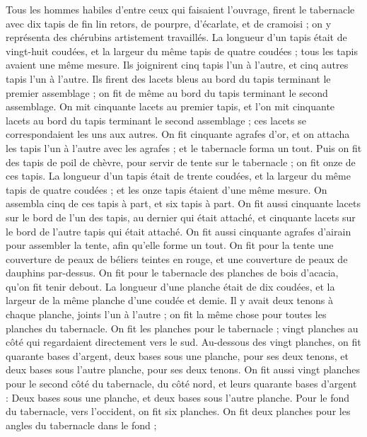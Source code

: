 \begin{multicols}{2}
Tous les hommes habiles d'entre ceux qui faisaient l'ouvrage, firent le tabernacle avec dix tapis de fin lin retors, de pourpre, d'écarlate, et de cramoisi ; on y représenta des chérubins artistement travaillés.
La longueur d'un tapis était de vingt-huit coudées, et la largeur du même tapis de quatre coudées ; tous les tapis avaient une même mesure.
Ils joignirent cinq tapis l'un à l'autre, et cinq autres tapis l'un à l'autre.
Ils firent des lacets bleus au bord du tapis terminant le premier assemblage ; on fit de même au bord du tapis terminant le second assemblage.
On mit cinquante lacets au premier tapis, et l’on mit cinquante lacets au bord du tapis terminant le second assemblage ; ces lacets se correspondaient les uns aux autres.
On fit cinquante agrafes d'or, et on attacha les tapis l'un à l'autre avec les agrafes ; et le tabernacle forma un tout.
Puis on fit des tapis de poil de chèvre, pour servir de tente sur le tabernacle ; on fit onze de ces tapis.
La longueur d'un tapis était de trente coudées, et la largeur du même tapis de quatre coudées ; et les onze tapis étaient d'une même mesure.
On assembla cinq de ces tapis à part, et six tapis à part.
On fit aussi cinquante lacets sur le bord de l'un des tapis, au dernier qui était attaché, et cinquante lacets sur le bord de l'autre tapis qui était attaché.
On fit aussi cinquante agrafes d'airain pour assembler la tente, afin qu’elle forme un tout.
On fit pour la tente une couverture de peaux de béliers teintes en rouge, et une couverture de peaux de dauphins par-dessus.
On fit pour le tabernacle des planches de bois d’acacia, qu'on fit tenir debout.
La longueur d’une planche était de dix coudées, et la largeur de la même planche d'une coudée et demie.
Il y avait deux tenons à chaque planche, joints l'un à l'autre ; on fit la même chose pour toutes les planches du tabernacle.
On fit les planches pour le tabernacle ; vingt planches au côté qui regardaient directement vers le sud.
Au-dessous des vingt planches, on fit quarante bases d'argent, deux bases sous une planche, pour ses deux tenons, et deux bases sous l'autre planche, pour ses deux tenons.
On fit aussi vingt planches pour le second côté du tabernacle, du côté nord,
et leurs quarante bases d'argent : Deux bases sous une planche, et deux bases sous l'autre planche.
Pour le fond du tabernacle, vers l'occident, on fit six planches.
On fit deux planches pour les angles du tabernacle dans le fond ;

\end{multicols}
